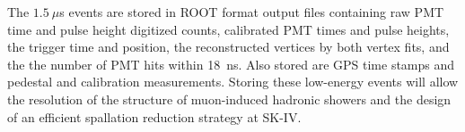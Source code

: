 The $1.5~\mu$s events are stored in ROOT format output files \cite{root} containing raw PMT time and pulse height digitized counts, calibrated PMT times and pulse heights, the trigger time and position, the reconstructed vertices by both vertex fits, and the the number of PMT hits within 18~ns. Also stored are GPS time stamps and pedestal and calibration measurements. Storing these low-energy events will allow the resolution of the structure of muon-induced hadronic showers and the design of an efficient spallation reduction strategy at SK-IV.